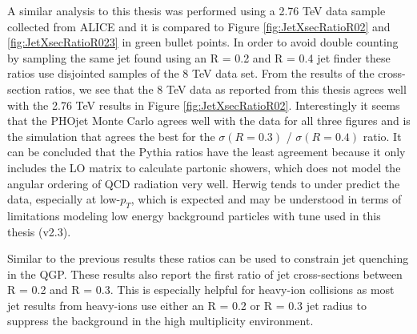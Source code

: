 

A similar analysis to this thesis was performed using a 2.76 TeV  data sample collected from ALICE\cite{MA2013319} and it is compared to Figure \ref{fig:JetXsecRatioR02} and \ref{fig:JetXsecRatioR023} in green bullet points.  In order to avoid double counting by sampling the same jet  found using an R = 0.2 and R = 0.4 jet finder these ratios use disjointed samples of the 8 TeV data set.  From the results of the cross-section ratios, we see that the 8 TeV data as reported from this thesis agrees well with the 2.76 TeV results in Figure \ref{fig:JetXsecRatioR02}.  Interestingly it seems that the PHOjet Monte Carlo agrees well with the data for all three figures and is the simulation that agrees the best for the $\sigma (R = 0.3)$ / $\sigma (R = 0.4)$ ratio.  It can be concluded that the Pythia ratios have the least agreement because it only includes the LO matrix to calculate partonic showers, which does not model the angular ordering of QCD radiation very well.  Herwig tends to under predict the data, especially at low-$p_{T}$, which is expected and may be understood in terms of limitations modeling low energy background particles with tune used in this thesis (v2.3).  

Similar to the previous results these ratios can be used to constrain jet quenching in the QGP.  These results also report the first ratio of jet cross-sections between R = 0.2 and R = 0.3.  This is especially helpful for heavy-ion collisions as most jet results from heavy-ions use either an R = 0.2 or R = 0.3 jet radius to suppress the background in the high multiplicity environment.


